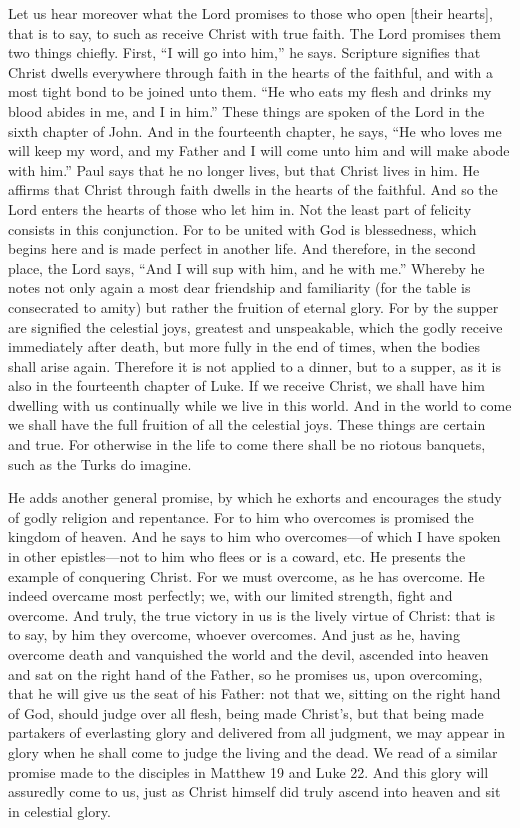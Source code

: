 Let us hear moreover what the Lord promises to those who open [their hearts], that is to say, to such as receive Christ with true faith. The Lord promises them two things chiefly. First, “I will go into him,” he says. Scripture signifies that Christ dwells everywhere through faith in the hearts of the faithful, and with a most tight bond to be joined unto them. “He who eats my flesh and drinks my blood abides in me, and I in him.” These things are spoken of the Lord in the sixth chapter of John. And in the fourteenth chapter, he says, “He who loves me will keep my word, and my Father and I will come unto him and will make abode with him.” Paul says that he no longer lives, but that Christ lives in him. He affirms that Christ through faith dwells in the hearts of the faithful. And so the Lord enters the hearts of those who let him in. Not the least part of felicity consists in this conjunction. For to be united with God is blessedness, which begins here and is made perfect in another life. And therefore, in the second place, the Lord says, “And I will sup with him, and he with me.” Whereby he notes not only again a most dear friendship and familiarity (for the table is consecrated to amity) but rather the fruition of eternal glory. For by the supper are signified the celestial joys, greatest and unspeakable, which the godly receive immediately after death, but more fully in the end of times, when the bodies shall arise again. Therefore it is not applied to a dinner, but to a supper, as it is also in the fourteenth chapter of Luke. If we receive Christ, we shall have him dwelling with us continually while we live in this world. And in the world to come we shall have the full fruition of all the celestial joys. These things are certain and true. For otherwise in the life to come there shall be no riotous banquets, such as the Turks do imagine.

He adds another general promise, by which he exhorts and encourages the study of godly religion and repentance. For to him who overcomes is promised the kingdom of heaven. And he says to him who overcomes—of which I have spoken in other epistles—not to him who flees or is a coward, etc. He presents the example of conquering Christ. For we must overcome, as he has overcome. He indeed overcame most perfectly; we, with our limited strength, fight and overcome. And truly, the true victory in us is the lively virtue of Christ: that is to say, by him they overcome, whoever overcomes. And just as he, having overcome death and vanquished the world and the devil, ascended into heaven and sat on the right hand of the Father, so he promises us, upon overcoming, that he will give us the seat of his Father: not that we, sitting on the right hand of God, should judge over all flesh, being made Christ’s, but that being made partakers of everlasting glory and delivered from all judgment, we may appear in glory when he shall come to judge the living and the dead. We read of a similar promise made to the disciples in Matthew 19 and Luke 22. And this glory will assuredly come to us, just as Christ himself did truly ascend into heaven and sit in celestial glory.

